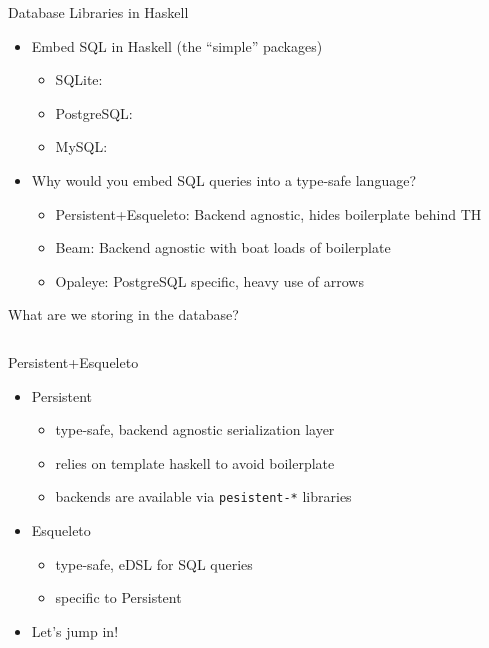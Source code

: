 \documentclass[hyperref={pdfpagelabels=false},12pt]{beamer}
\newcommand{\haskell}[1]{\texttt{#1}}
\newcommand{\unnamedUrl}[1]{\href{#1}{\color{blue}{#1}}}
\newcommand{\pygment}[3]{\inputminted[bgcolor=lightgray,linenos,fontsize=#1]{#2}{#3}}
\begin{document}
\begin{frame}{Database Libraries in Haskell}
  \begin{itemize}
    \item Embed SQL in Haskell (the ``simple'' packages)
    \begin{itemize}
      \item SQLite: \unnamedUrl{https://hackage.haskell.org/package/sqlite-simple}
      \item PostgreSQL: \unnamedUrl{https://hackage.haskell.org/package/postgresql-simple}
      \item MySQL: \unnamedUrl{https://hackage.haskell.org/package/mysql-simple}
    \end{itemize}
    \item Why would you embed SQL queries into a type-safe language?
    \begin{itemize}
      \item Persistent+Esqueleto: Backend agnostic, hides boilerplate behind TH
      \item Beam: Backend agnostic with boat loads of boilerplate
      \item Opaleye: PostgreSQL specific, heavy use of arrows
    \end{itemize}
  \end{itemize}
\end{frame}

\begin{frame}{What are we storing in the database?}
  \pygment{\scriptsize}{haskell}{code/Person.hs}
\end{frame}

\begin{frame}{Persistent+Esqueleto}
  \begin{itemize}
    \item Persistent
    \begin{itemize}
        \item type-safe, backend agnostic serialization layer
        \item relies on template haskell to avoid boilerplate
        \item backends are available via \haskell{pesistent-*} libraries 
    \end{itemize}
    \item Esqueleto
    \begin{itemize}
        \item type-safe, eDSL for SQL queries
        \item specific to Persistent
    \end{itemize}
    \item Let's jump in!
  \end{itemize}
\end{frame}
\end{document}
